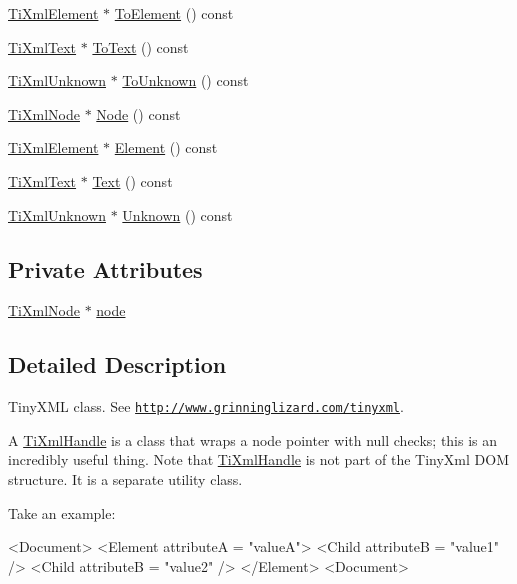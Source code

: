 \begin{DoxyCompactItemize}
\item 
\hyperlink{class_ti_xml_element}{Ti\+Xml\+Element} $\ast$ \hyperlink{class_ti_xml_handle_a0e3a5333550237d899b1df2b965611a1}{To\+Element} () const
\item 
\hyperlink{class_ti_xml_text}{Ti\+Xml\+Text} $\ast$ \hyperlink{class_ti_xml_handle_abde286bce1d5db0d20ec30e573278cdf}{To\+Text} () const
\item 
\hyperlink{class_ti_xml_unknown}{Ti\+Xml\+Unknown} $\ast$ \hyperlink{class_ti_xml_handle_a450ec91dac1ded02d72eb918d062ad31}{To\+Unknown} () const
\item 
\hyperlink{class_ti_xml_node}{Ti\+Xml\+Node} $\ast$ \hyperlink{class_ti_xml_handle_aec0e3ea58ff98a45cd13507a02e2ca1e}{Node} () const
\item 
\hyperlink{class_ti_xml_element}{Ti\+Xml\+Element} $\ast$ \hyperlink{class_ti_xml_handle_ae9b22d71bf5f69ee5fda28f5ad21f19c}{Element} () const
\item 
\hyperlink{class_ti_xml_text}{Ti\+Xml\+Text} $\ast$ \hyperlink{class_ti_xml_handle_ad3b502c72059421e4dfcc7bda3c392fe}{Text} () const
\item 
\hyperlink{class_ti_xml_unknown}{Ti\+Xml\+Unknown} $\ast$ \hyperlink{class_ti_xml_handle_a12b32f098c7daa5facbc04e9618262c5}{Unknown} () const
\end{DoxyCompactItemize}
\subsection*{Private Attributes}
\begin{DoxyCompactItemize}
\item 
\hyperlink{class_ti_xml_node}{Ti\+Xml\+Node} $\ast$ \hyperlink{class_ti_xml_handle_ac5429de14bb78b16288bac5bf33c6858}{node}
\end{DoxyCompactItemize}


\subsection{Detailed Description}
Tiny\+X\+ML class. See \href{http://www.grinninglizard.com/tinyxml}{\tt http\+://www.\+grinninglizard.\+com/tinyxml}. 

A \hyperlink{class_ti_xml_handle}{Ti\+Xml\+Handle} is a class that wraps a node pointer with null checks; this is an incredibly useful thing. Note that \hyperlink{class_ti_xml_handle}{Ti\+Xml\+Handle} is not part of the Tiny\+Xml D\+OM structure. It is a separate utility class.

Take an example\+: \begin{DoxyVerb}<Document>
<Element attributeA = "valueA">
<Child attributeB = "value1" />
<Child attributeB = "value2" />
</Element>
<Document>
\end{DoxyVerb}


